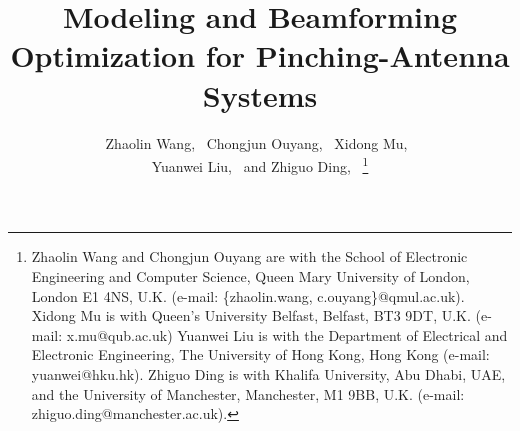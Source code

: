 

\title{Modeling and Beamforming Optimization for Pinching-Antenna Systems}



\author{
        Zhaolin Wang,~
        Chongjun Ouyang,~ Xidong Mu,~\\
        Yuanwei Liu,~ and Zhiguo Ding,~
\thanks{Zhaolin Wang and Chongjun Ouyang are with the School of Electronic Engineering and Computer Science, Queen Mary University of London, London E1 4NS, U.K. (e-mail: \{zhaolin.wang, c.ouyang\}@qmul.ac.uk). Xidong Mu is with Queen's University Belfast, Belfast, BT3 9DT, U.K. (e-mail: x.mu@qub.ac.uk) Yuanwei Liu is with the Department of Electrical and Electronic Engineering, The University of Hong Kong, Hong Kong (e-mail: yuanwei@hku.hk). Zhiguo Ding is with Khalifa University, Abu Dhabi, UAE, and the University of Manchester, Manchester, M1 9BB, U.K. (e-mail: zhiguo.ding@manchester.ac.uk).}
\vspace{-0.3cm}
}
